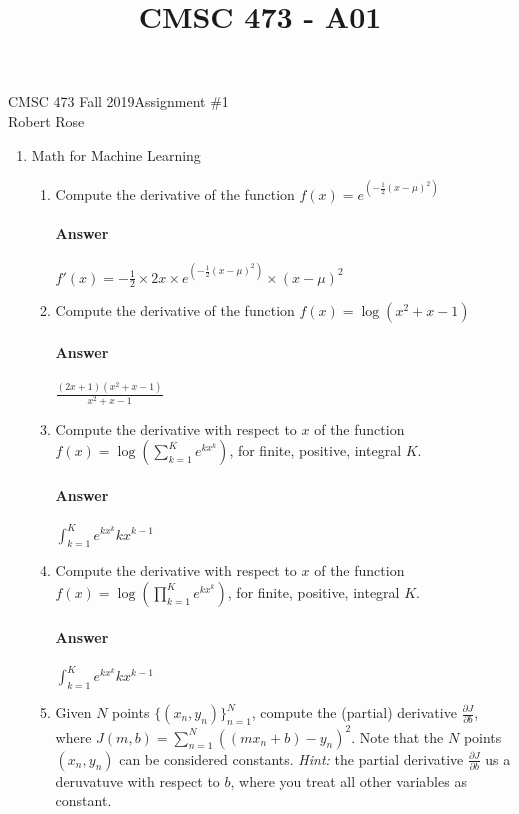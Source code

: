 \documentclass[12pt]{article}
\title{CMSC 473 - A01}
\begin{document}
CMSC 473 Fall 2019\hfill Assignment \#1\\
Robert Rose

\hrulefill

\begin{enumerate}
\item Math for Machine Learning
  \begin{enumerate}
  \item Compute the derivative of the function $f(x) = e^{(-\frac{1}{2}(x - \mu)^2)}$\\
  \vspace{-2.5em}
  \paragraph{Answer}  $f'(x) = - \frac{1}{2} \times 2x \times e^{(-\frac{1}{2}(x - \mu)^2)} \times (x - \mu)^2$

  \item Compute the derivative of the function $f(x) = \log(x^2 + x - 1)$\\
  \vspace{-2.5em}
  \paragraph{Answer} $\frac{(2x + 1)(x^2 + x - 1)}{x^2 + x - 1}$

  \item Compute the derivative with respect to $x$ of the function 
        $f(x) = \log(\sum_{k=1}^{K}e^{kx^k})$, for finite, positive, integral $K$.\\
  \vspace{-2.5em}
  \paragraph{Answer} $\int_{k=1}^{K}e^{kx^k}kx^{k-1}$

  \item Compute the derivative with respect to $x$ of the function
        $f(x) = \log(\prod_{k=1}^{K}e^{kx^k})$, for finite, positive, integral $K$.\\
  \vspace{-2.5em}
  \paragraph{Answer} $\int_{k=1}^{K}e^{kx^k}kx^{k-1}$

  \item Given $N$ points $\{(x_n,y_n)\}_{n=1}^{N}$, compute the (partial) derivative
        $\frac{\partial J}{\partial b}$, where $J(m,b) = \sum_{n=1}^{N}( ( mx_n + b ) - y_n )^2$. 
        Note that the $N$ points $(x_n, y_n)$ can be considered constants. \textit{Hint:} the
        partial derivative $\frac{\partial J}{\partial b}$ us a deruvatuve with respect to $b$,
        where you treat all other variables as constant.\\
  \vspace{-2.5em}

\end{enumerate}
\end{enumerate}
\end{document}
